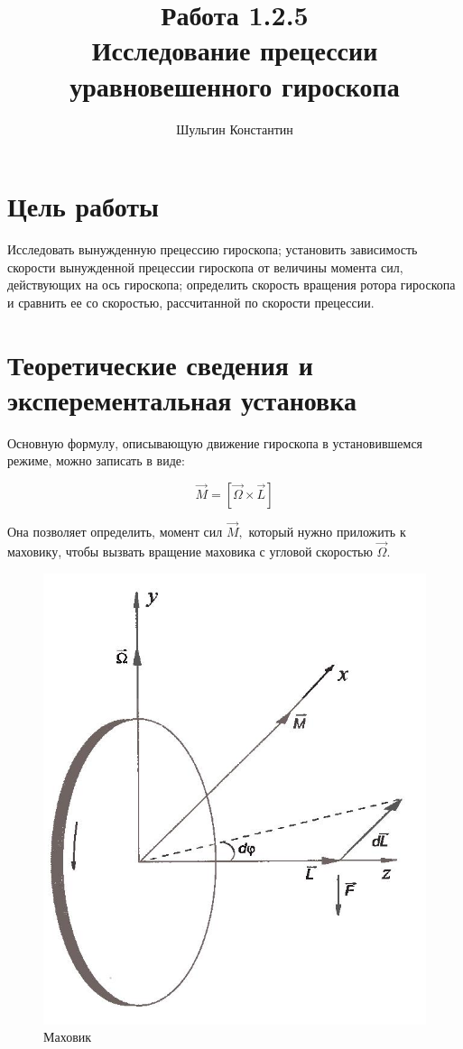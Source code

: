 \documentclass[12pt]{article}
\title{Работа 1.2.5 \\ Исследование прецессии уравновешенного гироскопа}
\date{}
\author{Шульгин Константин}
\begin{document}
\maketitle

\section*{Цель работы}
Исследовать вынужденную прецессию гироскопа; установить зависимость скорости вынужденной прецессии гироскопа от величины момента сил, действующих на ось гироскопа; определить скорость вращения ротора гироскопа и сравнить ее со скоростью, рассчитанной по скорости прецессии.

\section*{Теоретические сведения и эксперементальная установка}
Основную формулу, описывающую движение гироскопа в установившемся режиме, можно записать в виде:

$$\vec{M} = [\vec{\Omega} \times \vec{L}]$$

Она позволяет определить, момент сил $ \vec{M}, $ который нужно приложить к маховику, чтобы вызвать вращение маховика с угловой скоростью $\vec{\Omega}$.

\begin{figure}[h!]
        \vspace{-2ex} 
	\begin{center}
	\includegraphics[scale=0.35]{flywheel}
        \end{center}
	\caption{Маховик}
\end{figure}
\end{document}
